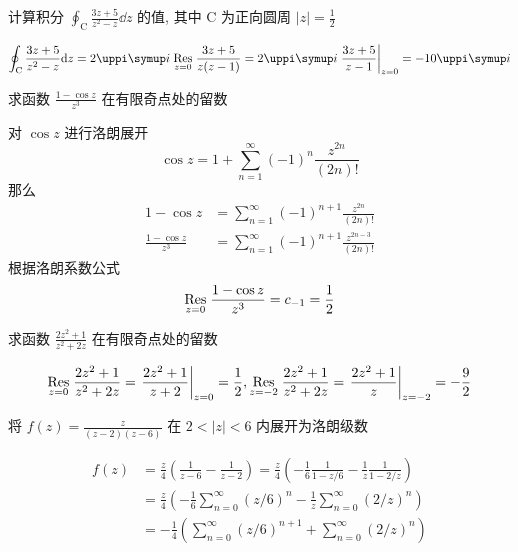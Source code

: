 \begin{ti}[$7$ 分]
	计算积分 $\oint_{\mathrm{C}}\frac{3z+5}{z^2-z}\dd z$ 的值, 其中 $\mathrm{C}$ 为正向圆周 $|z|=\frac{1}{2}$
	\begin{solution}
		\begin{equation*}
			\oint_{\mathrm{C}}\frac{3z+5}{z^2-z}\dd z=2\uppi\ii\underset{z=0}{\Res}\frac{3z+5}{z(z-1)}=2\uppi\ii\left.\frac{3z+5}{z-1}\right|_{z=0}=-10\uppi\ii
		\end{equation*}
	\end{solution}
\end{ti}

\begin{ti}[$7$ 分]
	求函数 $\frac{1-\cos z}{z^3}$ 在有限奇点处的留数
	\begin{solution}
		对 $\cos z$ 进行洛朗展开
		\[
			\cos z=1+\sum_{n=1}^{\infty}(-1)^n\frac{z^{2n}}{(2n)!}
		\]
		那么
		\begin{align*}
			1-\cos z&=\sum_{n=1}^{\infty}(-1)^{n+1}\frac{z^{2n}}{(2n)!} \\
			\frac{1-\cos z}{z^3}&=\sum_{n=1}^{\infty}(-1)^{n+1}\frac{z^{2n-3}}{(2n)!}
		\end{align*}
		根据洛朗系数公式
		\[
			\underset{z=0}{\Res}\frac{1-\cos z}{z^3}=c_{-1}=\frac{1}{2}
		\]
	\end{solution}
\end{ti}

\begin{ti}[$7$ 分]
	求函数 $\frac{2z^2+1}{z^2+2z}$ 在有限奇点处的留数
	\begin{solution}
		\begin{equation*}
			\underset{z=0}{\Res}\frac{2z^2+1}{z^2+2z}=\left.\frac{2z^2+1}{z+2} \right|_{z=0}=\frac{1}{2},
			\underset{z=-2}{\Res}\frac{2z^2+1}{z^2+2z}=\left.\frac{2z^2+1}{z}\right|_{z=-2}=-\frac{9}{2}
		\end{equation*}
	\end{solution}
\end{ti}

\begin{ti}[$10$ 分]
	将 $f(z)=\frac{z}{(z-2)(z-6)}$ 在 $2<|z|<6$ 内展开为洛朗级数
	\begin{solution}
		\begin{align*}
			f(z)&=\frac{z}{4}\left( \frac{1}{z-6}-\frac{1}{z-2}\right) =\frac{z}{4}\left( -\frac{1}{6}\frac{1}{1-z/6}-\frac{1}{z}\frac{1}{1-2/z}\right) \\
			&=\frac{z}{4}\left( -\frac{1}{6}\sum_{n=0}^{\infty}(z/6)^n-\frac{1}{z}\sum_{n=0}^{\infty}(2/z)^n\right)\\
			&=-\frac{1}{4}\left( \sum_{n=0}^{\infty}(z/6)^{n+1}+\sum_{n=0}^{\infty}(2/z)^n\right)  
		\end{align*}
	\end{solution}
\end{ti}

